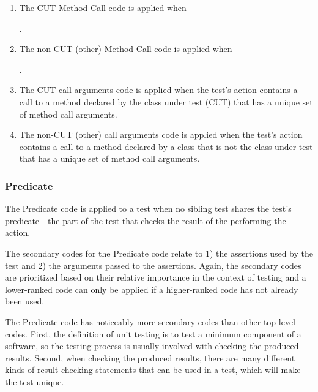 \begin{enumerate}
    \item The CUT Method Call code is applied when 
    .
    \item The non-CUT (other) Method Call code is applied when 
    .
    \item The CUT call arguments code is applied when the test’s action contains a call to a method declared by the class under test (CUT) that has a unique set of method call arguments. 
    \item The non-CUT (other) call arguments code is applied when the test’s action contains a call to a method declared by a class that is not the class under test that has a unique set of method call arguments. 
\end{enumerate}

\subsubsection{Predicate}

The Predicate code is applied to a test when no sibling test shares the test’s predicate - the part of the test that checks the result of the performing the action.

The secondary codes for the Predicate code relate to 1) the assertions used by the test and 2) the arguments passed to the assertions.
%
Again, the secondary codes are prioritized based on their relative importance in the context of testing and a lower-ranked code can only be applied if a higher-ranked code has not already been used.

The Predicate code has noticeably more secondary codes than other top-level codes.
%
First, the definition of unit testing is to test a minimum component of a software, so the testing process is usually involved with checking the produced results.
%
Second, when checking the produced results, there are many different kinds of result-checking statements that can be used in a test, which will make the test unique.

